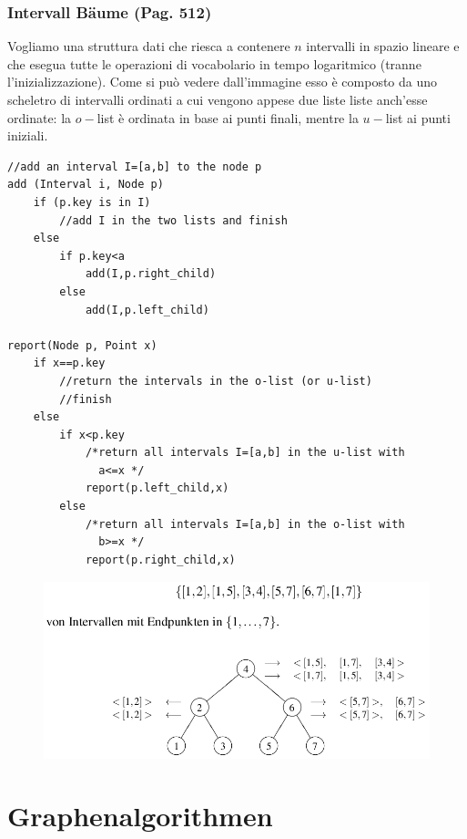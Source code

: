 \documentclass[a4paper]{book}
\newcommand{\lstIndent}{4}
\begin{document}
\subsection{Intervall Bäume (Pag. 512)}
Vogliamo una struttura dati che riesca a contenere $n$ intervalli in spazio lineare e che esegua tutte le operazioni di vocabolario in tempo logaritmico (tranne l'inizializzazione). Come si può vedere dall'immagine esso è composto da uno scheletro di intervalli ordinati a cui vengono appese due liste liste anch'esse ordinate: la $o-$list è ordinata in base ai punti finali, mentre la $u-$list ai punti iniziali.
\begin{lstlisting}[tabsize=\lstIndent]
//add an interval I=[a,b] to the node p
add (Interval i, Node p)
	if (p.key is in I)
		//add I in the two lists and finish
	else
		if p.key<a
			add(I,p.right_child)
		else
			add(I,p.left_child)	
			
report(Node p, Point x)
	if x==p.key
		//return the intervals in the o-list (or u-list)
		//finish
	else
		if x<p.key
			/*return all intervals I=[a,b] in the u-list with			
			  a<=x */
			report(p.left_child,x)
		else	
			/*return all intervals I=[a,b] in the o-list with			
			  b>=x */ 
			report(p.right_child,x)  
\end{lstlisting}
\begin{figure}[H]
\centering
\includegraphics[scale=0.4]{Figures/rangetree.png}
\end{figure}

\chapter{Graphenalgorithmen}
\end{document}
